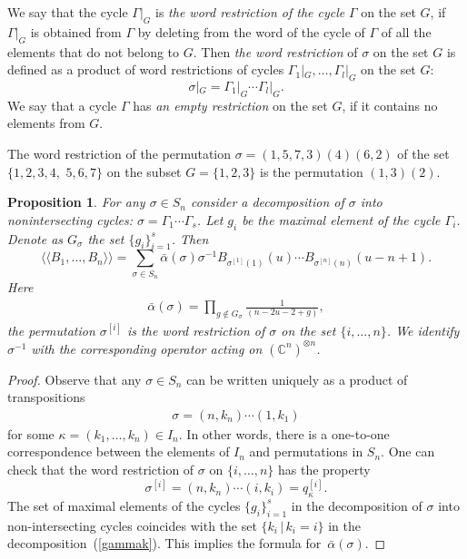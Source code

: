 \documentclass[11pt]{article}
\newtheorem{proposition}{Proposition}
\newcommand{\CC}{\mathbb C}    %
\begin{document}
\begin{definition}
We say that the cycle $\Gamma |_G$ is {\it {the word restriction of  the cycle}}  $\Gamma$ on the set $G$, if~$\Gamma |_G$ is obtained from $\Gamma$ by deleting   from the  word of the cycle of $\Gamma$ of all the elements that do not belong to  $G$.
Then {\it {the word restriction}} of $\sigma$ on the set $G$ is def\/ined as a product of word restrictions of cycles $\Gamma_1|_G, \dots, \Gamma_l|_G $ on the set $G$:
\[
\sigma|_G=
\Gamma_1|_G \cdots \Gamma_l|_G.
\]
We say that a cycle $\Gamma$  has {\it{an empty restriction}} on the set $G$, if it contains no elements from $G$.
 \end{definition}
 \begin{example} The word restriction of the permutation $\sigma =(1,5,7,3)(4)(6,2)$ of the set $\{1,2,3,4,$ $5,6,7\}$ on the subset $G=\{1,2,3\}$
 is  the permutation $(1,3)(2)$.
 \end{example}

\begin{proposition}\label{QC}  For any  $\sigma\in S_n$ consider  a decomposition of $\sigma$  into nonintersecting cycles:
$\sigma = \Gamma_1\cdots \Gamma_s$.
Let $g_i$ be the maximal element of the cycle $\Gamma_i$.   Denote as $G_\sigma$ the set $\{g_i\}_{i=1}^{s}$.
Then
\[
\langle \langle B_1,\dots, B_n\rangle \rangle
=\sum_{\sigma \in S_n }\bar\alpha{(\sigma)} \sigma^{-1} B_{\sigma^{[1]}(1)}(u)\cdots B_{\sigma^{[n]}(n)}(u-n+1).
\]
Here
\begin{gather*}%
\bar\alpha{(\sigma)}=
\prod_{g\notin G_\sigma} \frac{1}{ (n-2u-2+g)},
\end{gather*}
the permutation $\sigma^{[i]}$ is the word restriction of  $\sigma$ on the set $\{i, \dots, n\}$. We identify $\sigma^{-1}$  with the corresponding operator acting on $(\CC^n)^{\otimes n}$.
\end{proposition}


\begin{proof}
Observe that any $\sigma\in S_n $ can be written  uniquely as a product of transpositions
\begin{gather}\label{gammak}
\sigma=(n,k_n)\cdots (1,k_1)
\end{gather}
 for some $\kappa=(k_1,\dots, k_n)\in I_n$. In other words, there  is a one-to-one correspondence between the elements of $I_n$  and permutations in $S_n$. One can check that the word restriction  of $\sigma$ on $\{i,\dots,n\}$  has the property
\[
\sigma^{[i]}=(n,k_n)\cdots (i,k_i)=q^{[i]}_{\kappa}.
\]
The set of   maximal elements  of the cycles  $\{g_{i}\}_{i=1}^{s}$  in the decomposition of $\sigma$ into non-intersecting cycles  coincides with the set $\{k_i\,| \, k_i=i\}$ in  the decomposition~(\ref{gammak}). This implies the formula for~$\bar\alpha(\sigma)$.
\end{proof}
\end{document}
